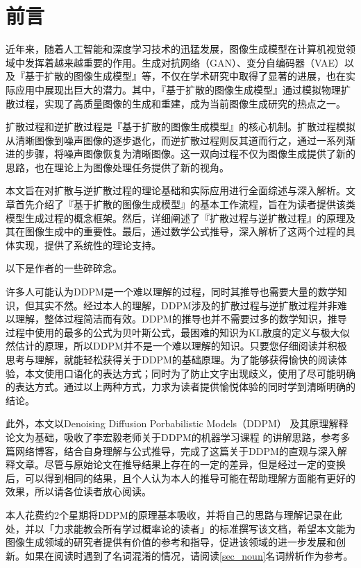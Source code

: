 \section{前言}

近年来，随着人工智能和深度学习技术的迅猛发展，图像生成模型在计算机视觉领域中发挥着越来越重要的作用。生成对抗网络（GAN）、变分自编码器（VAE）以及『基于扩散的图像生成模型』等，不仅在学术研究中取得了显著的进展，也在实际应用中展现出巨大的潜力。其中，『基于扩散的图像生成模型』通过模拟物理扩散过程，实现了高质量图像的生成和重建，成为当前图像生成研究的热点之一。

扩散过程和逆扩散过程是『基于扩散的图像生成模型』的核心机制。扩散过程模拟从清晰图像到噪声图像的逐步退化，而逆扩散过程则反其道而行之，通过一系列渐进的步骤，将噪声图像恢复为清晰图像。这一双向过程不仅为图像生成提供了新的思路，也在理论上为图像处理任务提供了新的视角。

本文旨在对扩散与逆扩散过程的理论基础和实际应用进行全面综述与深入解析。文章首先介绍了『基于扩散的图像生成模型』的基本工作流程，旨在为读者提供该类模型生成过程的概念框架。然后，详细阐述了『扩散过程与逆扩散过程』的原理及其在图像生成中的重要性。最后，通过数学公式推导，深入解析了这两个过程的具体实现，提供了系统性的理论支持。

以下是作者的一些碎碎念。

许多人可能认为DDPM是一个难以理解的过程，同时其推导也需要大量的数学知识，但其实不然。经过本人的理解，DDPM涉及的扩散过程与逆扩散过程并非难以理解，整体过程简洁而有效。DDPM的推导也并不需要过多的数学知识，推导过程中使用的最多的公式为贝叶斯公式，最困难的知识为KL散度的定义与极大似然估计的原理，所以DDPM并不是一个难以理解的知识。只要您仔细阅读并积极思考与理解，就能轻松获得关于DDPM的基础原理。为了能够获得愉快的阅读体验，本文使用口语化的表达方式；同时为了防止文字出现歧义，使用了尽可能明确的表达方式。通过以上两种方式，力求为读者提供愉悦体验的同时学到清晰明确的结论。

此外，本文以Denoising Diffusion Porbabilistic Models（DDPM）
\cite{hoDenoisingDiffusionProbabilistic2020a}及其原理解释论文\cite{luoUnderstandingDiffusionModels2022}为基础，吸收了李宏毅老师关于DDPM的机器学习课程
\cite{XiangBuChuLaiNiChengYouXiangGaiShengChengShiAIDiffusionModel2023}
\cite{XiangBuChuLaiNiChengYouXiangGaiShengChengShiAIDiffusionModel2023a}\cite{XiangBuChuLaiNiChengYouXiangGaiShengChengShiAIDiffusionModel2023b}
\cite{XiangBuChuLaiNiChengYouXiangGaiShengChengShiAIDiffusionModel2023c}
\cite{XiangBuChuLaiNiChengYouXiangGaiShengChengShiAIDiffusionModel2023d}
\cite{XiangBuChuLaiNiChengYouXiangGaiShengChengShiAIDiffusionModel2023e}
的讲解思路，参考多篇网络博客\cite{DiffusionModelsShengChengKuoSanMoXing}，结合自身理解与公式推导，完成了这篇关于DDPM的直观与深入解释文章。尽管与原始论文\cite{hoDenoisingDiffusionProbabilistic2020a}在推导结果上存在的一定的差异，但是经过一定的变换后，可以得到相同的结果，且个人认为本人的推导可能在帮助理解方面能有更好的效果，所以请各位读者放心阅读。

本人花费约2个星期将DDPM的原理基本吸收，并将自己的思路与理解记录在此处，并以「力求能教会所有学过概率论的读者」的标准撰写该文档，希望本文能为图像生成领域的研究者提供有价值的参考和指导，促进该领域的进一步发展和创新。如果在阅读时遇到了名词混淆的情况，请阅读\ref{sec_noun}名词辨析作为参考。